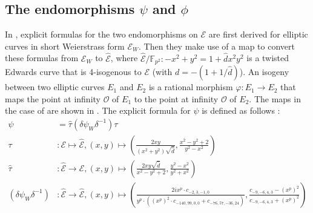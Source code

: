 \subsection{\texorpdfstring{The endomorphisms $\psi$ and $\phi$}{The endomorphisms psi and phi}} \label{subsec: The endomorphisms psi and phi}
In \cite{costello2015fourq}, explicit formulas for the two endomorphisms on $\mathcal{E}$ are first derived for elliptic curves in short Weierstrass form $\mathcal{E}_W$.
Then they make use of a map to convert these formulas from $\mathcal{E}_W$ to $\hat{\mathcal{E}}$, where $\hat{\mathcal{E}} \slash \mathbb{F}_{p^2} : -x^2 + y^2 = 1 + \hat{d}x^2y^2$ is a twisted Edwards curve that is 4-isogenous to $\mathcal{E}$ (with $d = -(1 + 1 / \hat{d})$).
An isogeny between two elliptic curves $E_1$ and $E_2$ is a rational morphism $\varphi : E_1 \to E_2$ that maps the point at infinity $\mathcal{O}$ of $E_1$ to the point at infinity $\mathcal{O}$ of $E_2$.
The maps in the case of {\fourq} are shown in \cite[§3]{costello2015fourq}.
The explicit formula for $\psi$ is defined as follows \cite{costello2015fourq}:
%
\begin{align*}
\psi &= \hat{\tau} (\delta \psi_W \delta^{-1}) \tau \\
%
\tau &: \mathcal{E} \mapsto \hat{\mathcal{E}}, (x, y) \mapsto \left( \frac{2xy}{\left( x^2 + y^ 2 \right) \sqrt{\hat{d}}}, \frac{x^ 2 - y^2 + 2}{y^2 - x^2} \right) \\
%
\hat{\tau} &: \hat{\mathcal{E}} \to \mathcal{E}, (x, y) \mapsto \left( \frac{2xy \sqrt{\hat{d}}}{x^2 - y^2 + 2}, \frac{y^2 - x^2}{y^2 + x^2} \right) \\
%
(\delta \psi_W \delta^{-1}) &: \hat{\mathcal{E}} \to \hat{\mathcal{E}}, (x,y) \mapsto \left( \frac{2ix^p \cdot c_{-2, 3, -1, 0}}{y^p \cdot ((x^p)^2 \cdot c_{-140, 99, 0, 0} + c_{-76, 57, -36, 24})}, \frac{c_{-9, -6, 4, 3} - (x^p)^2 }{c_{-9, -6, 4, 3} + (x^p)^2} \right)
\end{align*}
